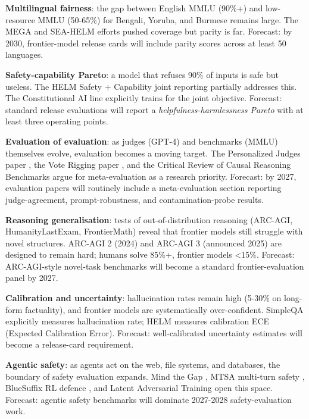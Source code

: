 \documentclass{article}
\begin{document}
\textbf{Multilingual fairness}: the gap between English MMLU (90\%+) and low-resource MMLU (50-65\%) for Bengali, Yoruba, and Burmese remains large. The MEGA \cite{ahuja20232023} and SEA-HELM \cite{susanto20252025} efforts pushed coverage but parity is far. Forecast: by 2030, frontier-model release cards will include parity scores across at least 50 languages.

\textbf{Safety-capability Pareto}: a model that refuses 90\% of inputs is safe but useless. The HELM Safety + Capability joint reporting partially addresses this. The Constitutional AI line \cite{bai20222022} explicitly trains for the joint objective. Forecast: standard release evaluations will report a \emph{helpfulness-harmlessness Pareto} with at least three operating points.

\textbf{Evaluation of evaluation}: as judges (GPT-4) and benchmarks (MMLU) themselves evolve, evaluation becomes a moving target. The Personalized Judges paper \cite{dong2024canllmbeapersonali}, the Vote Rigging paper \cite{min20252025}, and the Critical Review of Causal Reasoning Benchmarks \cite{yang20242024} argue for meta-evaluation as a research priority. Forecast: by 2027, evaluation papers will routinely include a meta-evaluation section reporting judge-agreement, prompt-robustness, and contamination-probe results.

\textbf{Reasoning generalisation}: tests of out-of-distribution reasoning (ARC-AGI, HumanityLastExam, FrontierMath) reveal that frontier models still struggle with novel structures. ARC-AGI 2 (2024) and ARC-AGI 3 (announced 2025) are designed to remain hard; humans solve 85\%+, frontier models \textless15\%. Forecast: ARC-AGI-style novel-task benchmarks will become a standard frontier-evaluation panel by 2027.

\textbf{Calibration and uncertainty}: hallucination rates remain high (5-30\% on long-form factuality), and frontier models are systematically over-confident. SimpleQA \cite{wei20242024} explicitly measures hallucination rate; HELM measures calibration ECE (Expected Calibration Error). Forecast: well-calibrated uncertainty estimates will become a release-card requirement.

\textbf{Agentic safety}: as agents act on the web, file systems, and databases, the boundary of safety evaluation expands. Mind the Gap \cite{wicaksono20252025}, MTSA multi-turn safety \cite{guo20252025}, BlueSuffix RL defence \cite{zhao20242024}, and Latent Adversarial Training \cite{sheshadri20242024} open this space. Forecast: agentic safety benchmarks will dominate 2027-2028 safety-evaluation work.
\end{document}
